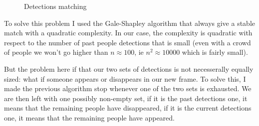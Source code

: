 \documentclass[a4paper, twocolumn]{article}
\newcommand{\changeSize}[1]{\fontsize{#1pt}{7.2}\selectfont}
\newcommand{\tinySize}{\changeSize{8}}
\begin{document}
\begin{figure}
        \caption{Detections matching}
        \label{pred_match}
    \end{figure}

    To solve this problem I used the Gale-Shapley algorithm \cite{10.2307/2312726} that always give a stable match with a quadratic complexity. In our case, the complexity is quadratic with respect to the number of past people detections that is small (even with a crowd of people we won't go higher than $n \approx 100$, ie $n^2 \approx 10000$ which is fairly small).

    But the problem here if that our two sets of detections is not necesserally equally sized: what if someone appears or disappears in our new frame. To solve this, I made the previous algorithm stop whenever one of the two sets is exhausted. We are then left with one possibly non-empty set, if it is the past detections one, it means that the remaining people have disappeared, if it is the current detections one, it means that the remaining people have appeared.
\end{document}
